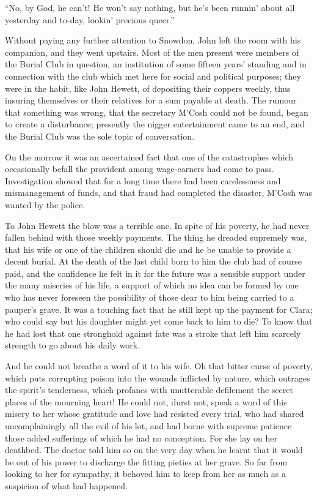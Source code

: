 ``No, by God, he can't! He won't say nothing, but he's been runnin'
about all yesterday and to-day, lookin' precious queer.''

Without paying any further attention to Snowdon, John left the room with
his companion, and they went upstairs. Most of the men present were
members of the Burial Club in question, an institution of some fifteen
years' standing and in connection with the club which met here for
social and political purposes; they were in the habit, like John Hewett,
of depositing their coppers weekly, thus insuring themselves or their
relatives for a sum payable at death. The rumour that something was
wrong, that the secretary M'Cosh could not be found, began to create a
disturbance; presently the nigger entertainment came to an end, and the
Burial Club was the sole topic of conversation.

On the morrow it was an ascertained fact {}that one of the catastrophes
which occasionally befall the provident among wage-earners had come to
pass. Investigation showed that for a long time there had been
carelessness and mismanagement of funds, and that fraud had completed
the disaster, M'Cosh was wanted by the police.

To John Hewett the blow was a terrible one. In spite of his poverty, he
had never fallen behind with those weekly payments. The thing he dreaded
supremely was, that his wife or one of the children should die and he be
unable to provide a decent burial. At the death of the last child born
to him the club had of course paid, and the confidence he felt in it for
the future was a sensible support under the many miseries of his life, a
support of which no idea can be formed by one who has never foreseen the
possibility of those dear to him being carried to a pauper's grave. It
was a touching fact that he still kept up the payment for Clara; who
could say but his daughter might yet come back to him to die? To know
that he had lost that one stronghold {}against fate was a stroke that
left him scarcely strength to go about his daily work.

And he could not breathe a word of it to his wife. Oh that bitter curse
of poverty, which puts corrupting poison into the wounds inflicted by
nature, which outrages the spirit's tenderness, which profanes with
unutterable defilement the secret places of the mourning heart! He could
not, durst not, speak a word of this misery to her whose gratitude and
love had resisted every trial, who had shared uncomplainingly all the
evil of his lot, and had borne with supreme patience those added
sufferings of which he had no conception. For she lay on her deathbed.
The doctor told him so on the very day when he learnt that it would be
out of his power to discharge the fitting pieties at her grave. So far
from looking to her for sympathy, it behoved him to keep from her as
much as a suspicion of what had happened.

